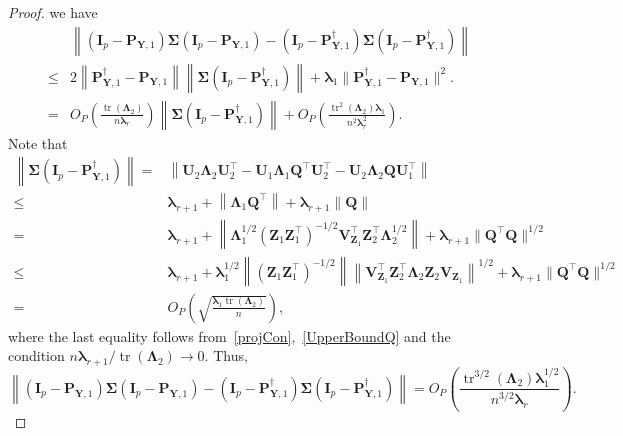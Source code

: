\documentclass[12pt]{article} %
\DeclareMathOperator{\mytr}{tr}
\newcommand{\bQ}{\mathbf{Q}}
\newcommand{\bZ}{\mathbf{Z}}
\newcommand{\bP}{\mathbf{P}}
\newcommand{\bY}{\mathbf{Y}}
\newcommand{\bI}{\mathbf{I}}
\newcommand{\bU}{\mathbf{U}}
\newcommand{\bV}{\mathbf{V}}
\newcommand{\bfsym}[1]{\ensuremath{\boldsymbol{#1}}}
\def\blambda {\bfsym {\lambda}}
\def\bLambda {\bfsym {\Lambda}}
\def\bSigma {\bfsym {\Sigma}}
\theoremstyle{definition}
\begin{document}
\begin{appendices}
\begin{proof}
we have
         \begin{equation*}
         \begin{split}
         &\left\|
         (\bI_p-\bP_{\bY,1})
         \bSigma 
         (\bI_p-\bP_{\bY,1})
         -
         (\bI_p-\bP_{\bY,1}^{\dagger})
         \bSigma 
         (\bI_p-\bP_{\bY,1}^{\dagger})
         \right\|
         \\
         \leq&
         2
         \left\|\bP_{\bY,1}^{\dagger}-\bP_{\bY,1}\right\|
         \left\|\bSigma 
         (\bI_p-\bP_{\bY,1}^{\dagger})\right\|
         +
         \blambda_1\|\bP_{\bY,1}^{\dagger}-\bP_{\bY,1}\|^2.
         \\
         = &
         O_P\left(\frac{\mytr(\bLambda_2)}{n\blambda_r}\right)
         \left\|\bSigma 
         (\bI_p-\bP_{\bY,1}^{\dagger})\right\|
         +
         O_P\left(\frac{\mytr^2(\bLambda_2)\blambda_1}{n^2\blambda_r^2}\right)
         .
         \end{split}
         \end{equation*}
Note that
\begin{equation*}
    \begin{split}
         \left\|\bSigma 
         (\bI_p-\bP_{\bY,1}^{\dagger})\right\|
         =&
         \left\|
         \bU_2 \bLambda_2 \bU_2^\top
         -\bU_1 \bLambda_1 \bQ^\top \bU_2^\top
         -\bU_2 \bLambda_2 \bQ \bU_1^\top
         \right\|
         \\
         \leq &
         \blambda_{r+1}
         +
         \left\|
          \bLambda_1 \bQ^\top
          \right\|
          +
          \blambda_{r+1}
          \left\|
          \bQ 
         \right\|
         \\
         = &
         \blambda_{r+1}
         +
         \left\|
         \bLambda_1^{1/2} (\bZ_1 \bZ_1^\top)^{-1/2} \bV_{\bZ_1}^\top \bZ_2^\top \bLambda_2^{1/2}
         \right\|
         +
         \blambda_{r+1}\|\bQ^\top \bQ\|^{1/2}
         \\
         \leq &
         \blambda_{r+1}
         +
         \blambda_1^{1/2}
         \left\|
        (\bZ_1 \bZ_1^\top)^{-1/2}
         \right\|
         \left\|
         \bV_{\bZ_1}^\top \bZ_2^\top \bLambda_2 \bZ_2 \bV_{\bZ_1}
         \right\|^{1/2}
         +
         \blambda_{r+1}\|\bQ^\top \bQ\|^{1/2}
         \\
         =&
         O_P\left(\sqrt{\frac{\blambda_1\mytr(\bLambda_2)}{n}}\right),
    \end{split}
\end{equation*}
where the last equality follows from~\eqref{projCon},~\eqref{UpperBoundQ} and the condition $n\blambda_{r+1}/\mytr(\bLambda_2)\to 0$.
Thus,
\begin{equation}\label{choc1}
         \left\|
         (\bI_p-\bP_{\bY,1})
         \bSigma 
         (\bI_p-\bP_{\bY,1})
         -
         (\bI_p-\bP_{\bY,1}^{\dagger})
         \bSigma 
         (\bI_p-\bP_{\bY,1}^{\dagger})
         \right\|
         = 
         O_P\left(\frac{\mytr^{3/2}(\bLambda_2)\blambda_1^{1/2}}{n^{3/2}\blambda_r}\right)
         .
         \end{equation}


\end{proof}
\end{appendices}
\end{document}
